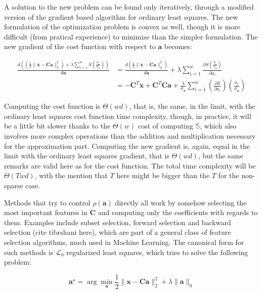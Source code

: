 \documentclass[12pt,a4paper,oneside,english]{UPBThesis}
\begin{document}
A solution to the new problem can be found only iteratively, through a modified version of the gradient based algorithm for ordinary least squares. The new formulation of the optimization problem is convex as well, though it is more difficult (from pratical experience) to minimize than the simpler formulation. The new gradient of the cost function with respect to $\textbf{a}$ becomes:

\begin{align*}
\frac{d \left( \left( \frac{1}{2}\|\textbf{x} - \textbf{C}\textbf{a}\|_2^2 \right) + \lambda\sum_{i=1}^{w}{S(\frac{a_i}{\sigma_{\textbf{a}}})} \right)}{d\textbf{a}} & = \frac{d \left( \frac{1}{2}\|\textbf{x} - \textbf{C}\textbf{a}\|_2^2 \right)}{d\textbf{a}} + \lambda\sum_{i=1}^{w}\frac{\partial S(\frac{a_i}{\sigma_{\textbf{a}}})}{\partial a_i} \\
& = -\textbf{C}^T\textbf{x} + \textbf{C}^T\textbf{C}\textbf{a} + \frac{\lambda}{\sigma_{\textbf{a}}} \sum_{i=1}^{w} {\left( \frac{\partial S}{\partial a_i} \right) \left( \frac{a_i}{\sigma_{\textbf{a}}} \right)}
\end{align*}

Computing the cost function is $\Theta(wd)$, that is, the same, in the limit, with the ordinary least squares cost function time complexity, though, in practice, it will be a little bit slower thanks to the $\Theta(w)$ cost of computing $\mathbb{S}$, which also involves more complex operations than the addition and multiplication necessary for the approximation part. Computing the new gradient is, again, equal in the limit with the ordinary least squares gradient, that is $\Theta(wd)$, but the same remarks are valid here as for the cost function. The total time complexity will be $\Theta(Twd)$, with the mention that $T$ here might be bigger than the $T$ for the non-sparse case.

Methods that try to control $\rho(\textbf{a})$ directly all work by somehow selecting the most important features in $\textbf{C}$ and computing only the coefficients with regards to them. Examples include subset selection, forward selection and backward selection (cite tibrshani here), which are part of a general class of feature selection algorithms, much used in Machine Learning. The canonical form for such methods is $\mathcal{L}_0$ regularized least squares, which tries to solve the following problem:

\begin{equation*}
\textbf{a}^{\star} = \arg\min_{\textbf{a}} \frac{1}{2} \| \textbf{x} - \textbf{C}\textbf{a} \|_2^2 + \lambda \| \textbf{a} \|_0
\end{equation*}
\end{document}
